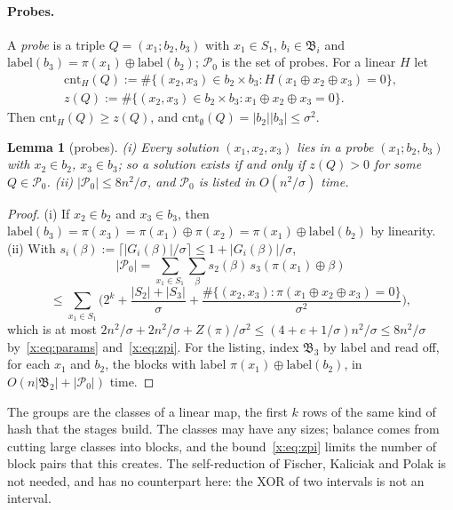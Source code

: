 \documentclass[11pt]{article}
\newtheorem{lemma}[theorem]{Lemma}
\theoremstyle{definition}
\theoremstyle{remark}
\newcommand{\cnt}{\mathrm{cnt}}
\newcommand{\Pq}{\mathcal{P}}
\begin{document}
\paragraph{Probes.} A \emph{probe} is a triple $Q=(x_1;b_2,b_3)$ with $x_1\in S_1$, $b_i\in\mathfrak B_i$ and $\mathrm{label}(b_3)=\pi(x_1)\oplus\mathrm{label}(b_2)$; $\Pq_0$ is the set of probes. For a linear $H$ let
\begin{gather*}
\cnt_H(Q):=\#\{(x_2,x_3)\in b_2\times b_3:H(x_1\oplus x_2\oplus x_3)=0\},\\
z(Q):=\#\{(x_2,x_3)\in b_2\times b_3:x_1\oplus x_2\oplus x_3=0\}.
\end{gather*}
Then $\cnt_H(Q)\ge z(Q)$, and $\cnt_\emptyset(Q)=|b_2||b_3|\le\sigma^2$.

\begin{lemma}[probes]\label{x:lem:probes}
\textup{(i)} Every solution $(x_1,x_2,x_3)$ lies in a probe $(x_1;b_2,b_3)$ with $x_2\in b_2$, $x_3\in b_3$; so a solution exists if and only if $z(Q)>0$ for some $Q\in\Pq_0$. \textup{(ii)} $|\Pq_0|\le8n^2/\sigma$, and $\Pq_0$ is listed in $O(n^2/\sigma)$ time.
\end{lemma}
\begin{proof}
(i) If $x_2\in b_2$ and $x_3\in b_3$, then $\mathrm{label}(b_3)=\pi(x_3)=\pi(x_1)\oplus\pi(x_2)=\pi(x_1)\oplus\mathrm{label}(b_2)$ by linearity. (ii) With $s_i(\beta):=\lceil|G_i(\beta)|/\sigma\rceil\le1+|G_i(\beta)|/\sigma$,
\[
|\Pq_0|=\sum_{x_1\in S_1}\sum_\beta s_2(\beta)\,s_3(\pi(x_1)\oplus\beta)\]
\[\le\sum_{x_1\in S_1}\Big(2^k+\frac{|S_2|+|S_3|}\sigma+\frac{\#\{(x_2,x_3):\pi(x_1\oplus x_2\oplus x_3)=0\}}{\sigma^2}\Big),
\]
which is at most $2n^2/\sigma+2n^2/\sigma+Z(\pi)/\sigma^2\le(4+e+1/\sigma)n^2/\sigma\le8n^2/\sigma$ by~\eqref{x:eq:params} and~\eqref{x:eq:zpi}. For the listing, index $\mathfrak B_3$ by label and read off, for each $x_1$ and $b_2$, the blocks with label $\pi(x_1)\oplus\mathrm{label}(b_2)$, in $O(n|\mathfrak B_2|+|\Pq_0|)$ time.
\end{proof}

The groups are the classes of a linear map, the first $k$ rows of the same kind of hash that the stages build. The classes may have any sizes; balance comes from cutting large classes into blocks, and the bound~\eqref{x:eq:zpi} limits the number of block pairs that this creates. The self-reduction of Fischer, Kaliciak and Polak is not needed, and has no counterpart here: the XOR of two intervals is not an interval.
\end{document}
